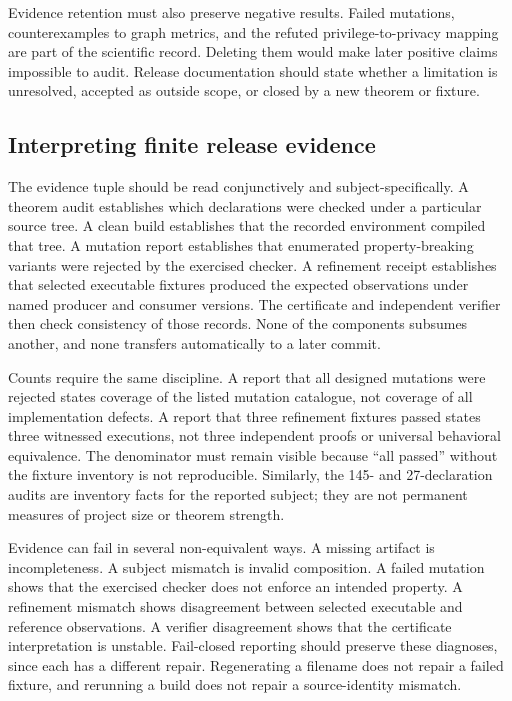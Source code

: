 Evidence retention must also preserve negative results. Failed mutations, counterexamples to graph metrics, and the refuted privilege-to-privacy mapping are part of the scientific record. Deleting them would make later positive claims impossible to audit. Release documentation should state whether a limitation is unresolved, accepted as outside scope, or closed by a new theorem or fixture.

\subsection{Interpreting finite release evidence}

The evidence tuple should be read conjunctively and subject-specifically. A theorem audit establishes which declarations were checked under a particular source tree. A clean build establishes that the recorded environment compiled that tree. A mutation report establishes that enumerated property-breaking variants were rejected by the exercised checker. A refinement receipt establishes that selected executable fixtures produced the expected observations under named producer and consumer versions. The certificate and independent verifier then check consistency of those records. None of the components subsumes another, and none transfers automatically to a later commit.

Counts require the same discipline. A report that all designed mutations were rejected states coverage of the listed mutation catalogue, not coverage of all implementation defects. A report that three refinement fixtures passed states three witnessed executions, not three independent proofs or universal behavioral equivalence. The denominator must remain visible because ``all passed'' without the fixture inventory is not reproducible. Similarly, the 145- and 27-declaration audits are inventory facts for the reported subject; they are not permanent measures of project size or theorem strength.

Evidence can fail in several non-equivalent ways. A missing artifact is incompleteness. A subject mismatch is invalid composition. A failed mutation shows that the exercised checker does not enforce an intended property. A refinement mismatch shows disagreement between selected executable and reference observations. A verifier disagreement shows that the certificate interpretation is unstable. Fail-closed reporting should preserve these diagnoses, since each has a different repair. Regenerating a filename does not repair a failed fixture, and rerunning a build does not repair a source-identity mismatch.


